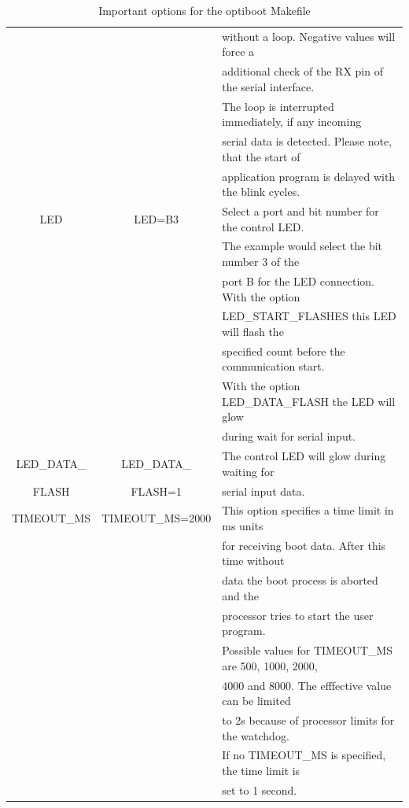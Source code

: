 \begin{table}[H]
\begin{center}
\begin{tabular}{| c | c | l |}
                   &                & without a loop. Negative values will force a \\
                   &                & additional check of the RX pin of the serial interface. \\
                   &                & The loop is interrupted immediately, if any incoming \\
                   &                & serial data is detected. Please note, that the start of \\
                   &                & application program is delayed with the blink cycles. \\

    \hline
 LED               & LED=B3         & Select a port and bit number for the control LED. \\
                   &                & The example would select the bit number 3 of the \\
                   &                & port B for the LED connection. With the option \\
                   &                & LED\_START\_FLASHES  this LED will flash the \\
                   &                & specified count before the communication start. \\
                   &                & With the option LED\_DATA\_FLASH the LED will glow \\
                   &                & during wait for serial input. \\
    \hline
 LED\_DATA\_       & LED\_DATA\_    & The control LED will glow during waiting for \\
      FLASH        &    FLASH=1     & serial input data. \\
    \hline
 TIMEOUT\_MS       & TIMEOUT\_MS=2000 & This option specifies a time limit in ms units \\
                   &                  & for receiving boot data. After this time without \\
                   &                  & data the boot process is aborted and the \\
                   &                  & processor tries to start the user program. \\
                   &                  & Possible values for TIMEOUT\_MS are 500, 1000, 2000, \\
                   &                  & 4000 and 8000. The efffective value can be limited \\
                   &                  & to 2s because of processor limits for the watchdog. \\
                   &                  & If no TIMEOUT\_MS is specified, the time limit is \\
                   &                  & set to 1 second. \\
    \hline
    \end{tabular}
  \end{center}
  \caption{Important options for the optiboot Makefile}
  \label{tab:options1}
\end{table}

